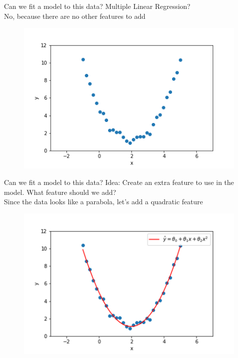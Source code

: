 \documentclass[aspectratio=169]{../latex_main/tntbeamer}  %
\begin{document}
	
	\begin{frame}{Can we fit a model to this data?}
	    Multiple Linear Regression?\\
	    No, because there are no other features to add
	    \begin{figure}
	        \centering
	        \includegraphics[scale=.6]{Bild1}
	    \end{figure}
	\end{frame}
	
	
	\begin{frame}{Can we fit a model to this data?}
	    Idea: Create an extra feature to use in the model. What feature should we add?\\
	    Since the data looks like a parabola, let’s add a quadratic feature
	    \begin{figure}
	        \centering
	        \includegraphics[scale=.65]{Bild3}
	    \end{figure}
	\end{frame}
	
\end{document}
